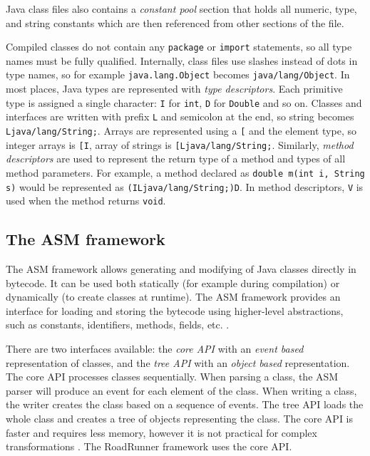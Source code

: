 Java class files also contains a \emph{constant pool} section that holds all
numeric, type, and string constants which are then referenced from other
sections of the file.


Compiled classes do not contain any \texttt{package} or \texttt{import}
statements, so all type names must be fully qualified. Internally, class files
use slashes instead of dots in type names, so for example
\texttt{java.lang.Object} becomes \texttt{java/lang/Object}. In most places,
Java types are represented with \emph{type descriptors}. Each primitive type is
assigned a single character: \texttt{I} for \texttt{int}, \texttt{D} for
\texttt{Double} and so on. Classes and interfaces are written with prefix
\texttt{L} and semicolon at the end, so string becomes
\texttt{Ljava/lang/String;}. Arrays are represented using a \texttt{[} and the
element type, so integer arrays is \texttt{[I}, array of strings is
\texttt{[Ljava/lang/String;}. Similarly, \emph{method descriptors} are used to
represent the return type of a method and types of all method parameters. For
example, a method declared as \texttt{double m(int i, String s)} would be
represented as \texttt{(ILjava/lang/String;)D}. In method descriptors,
\texttt{V} is used when the method returns \texttt{void}.

\subsection{The ASM framework}

The ASM framework allows generating and modifying of Java classes directly in
bytecode. It can be used both statically (for example during compilation) or
dynamically (to create classes at runtime). The ASM framework provides an
interface for loading and storing the bytecode using higher-level abstractions,
such as constants, identifiers, methods, fields, etc. \cite{asmguide}.

There are two interfaces available: the \emph{core API} with an \emph{event
based} representation of classes, and the \emph{tree API} with an \emph{object
based} representation. The core API processes classes sequentially. When parsing
a class, the ASM parser will produce an event for each element of the class.
When writing a class, the writer creates the class based on a sequence of
events. The tree API loads the whole class and creates a tree of objects
representing the class. The core API is faster and requires less memory, however
it is not practical for complex transformations \cite{asmguide}. The RoadRunner
framework uses the core API.

